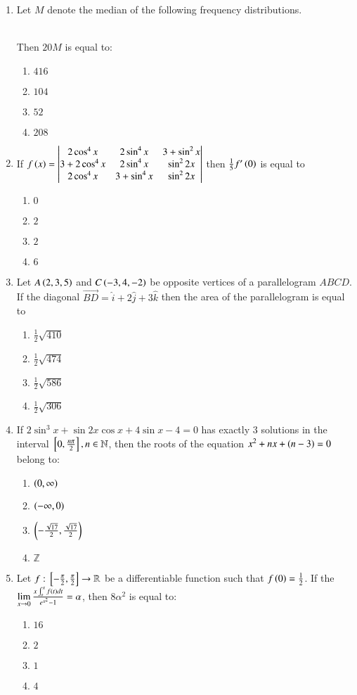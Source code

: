 \documentclass[journal]{IEEEtran}
\begin{document}
\begin{enumerate}
\item Let $M$ denote the median of the following frequency distributions.\\
	\begin{table}[h!]
		\centering
		
	\end{table}\\
	Then $20 M$ is equal to:
		\begin{enumerate}
	\item $416$
	\item $104$
	\item $52$
	\item $208$
		\end{enumerate}
	\item If $f\left(x\right) = \begin{vmatrix}2\cos^4x & 2\sin^4x & 3+\sin^2x \\ 3+2\cos^4x & 2\sin^4x & \sin^22x \\ 2\cos^4x & 3+\sin^4x & \sin^22x\end{vmatrix}$ then $\frac{1}{5}f^{\prime}\left(0\right)$ is equal to 
		\begin{enumerate}
			\item $0$
			\item $2$
			\item $2$
			\item $6$
		\end{enumerate}
	\item Let $A\left(2, 3, 5\right)$ and $C\left(-3, 4, -2\right)$ be opposite vertices of a parallelogram $ABCD$. If the diagonal $\overrightarrow{BD} = \hat{i}+2\hat{j}+3\hat{k}$ then the area of the parallelogram is equal to
		\begin{enumerate}
			\item $\frac{1}{2}\sqrt{410}$
			\item $\frac{1}{2}\sqrt{474}$
			\item $\frac{1}{2}\sqrt{586}$
			\item $\frac{1}{2}\sqrt{306}$
		\end{enumerate}
	\item If $2\sin^3x + \sin 2x \cos x + 4\sin x - 4 = 0$ has exactly $3$ solutions in the interval ${}\left[0,\frac{n\pi}{2}\right], n \in \mathbb{N}$, then the roots of the equation $x^2+nx+\left(n-3\right)=0$ belong to:
		\begin{enumerate}
			\item $\left(0, \infty\right)$
			\item $\left(-\infty, 0\right)$
			\item $\left(-\frac{\sqrt{17}}{2}, \frac{\sqrt{17}}{2}\right)$
			\item $\mathbb{Z}$
		\end{enumerate}
	\item Let $f:{}\left[-\frac{\pi}{2}, \frac{\pi}{2}\right] \to \mathbb{R}$ be a differentiable function such that $f\left(0\right)=\frac{1}{2}$. If the $\lim\limits_{x\to0} \frac{x\int_o^xf\left(t\right)dt}{e^{x^2}-1}=\alpha$, then $8\alpha^2$ is equal to:
		\begin{enumerate}
			\item $16$
			\item $2$
			\item $1$
			\item $4$
		\end{enumerate}
\end{enumerate}
\end{document}
